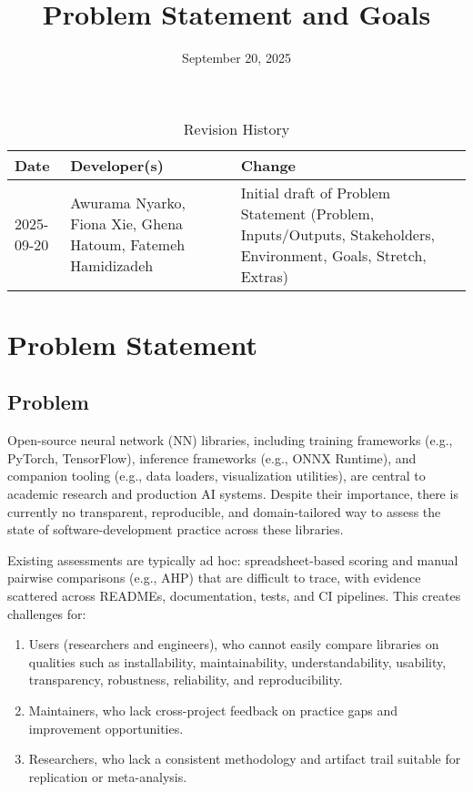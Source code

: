 \documentclass{article}
\title{Problem Statement and Goals\\\progname}
\author{\authname}
\date{September 20, 2025}
\begin{document}
\maketitle

\begin{table}[hp]
\caption{Revision History} \label{TblRevisionHistory}
\begin{tabularx}{\textwidth}{llX}
\toprule
\textbf{Date} & \textbf{Developer(s)} & \textbf{Change}\\
\midrule
    2025-09-20 & Awurama Nyarko, Fiona Xie, Ghena Hatoum, Fatemeh Hamidizadeh & Initial draft of Problem Statement (Problem, Inputs/Outputs, Stakeholders, Environment, Goals, Stretch, Extras)\\
\bottomrule
\end{tabularx}
\end{table}

\section{Problem Statement}



\subsection{Problem}
Open-source neural network (NN) libraries, including training frameworks
(e.g., PyTorch, TensorFlow), inference frameworks (e.g., ONNX Runtime),
and companion tooling (e.g., data loaders, visualization utilities), are central
to academic research and production AI systems. Despite their importance,
there is currently no transparent, reproducible, and domain-tailored way to
assess the state of software-development practice across these libraries.

Existing assessments are typically ad hoc: spreadsheet-based scoring and
manual pairwise comparisons (e.g., AHP) that are difficult to trace, with
evidence scattered across READMEs, documentation, tests, and CI
pipelines. This creates challenges for:

\begin{enumerate}
  \item Users (researchers and engineers), who cannot easily compare libraries 
  on qualities such as installability, maintainability, understandability, usability, 
  transparency, robustness, reliability, and reproducibility.
  
  \item Maintainers, who lack cross-project feedback on practice gaps and 
  improvement opportunities.
  
  \item Researchers, who lack a consistent methodology and artifact trail 
  suitable for replication or meta-analysis.
\end{enumerate}
\end{document}
